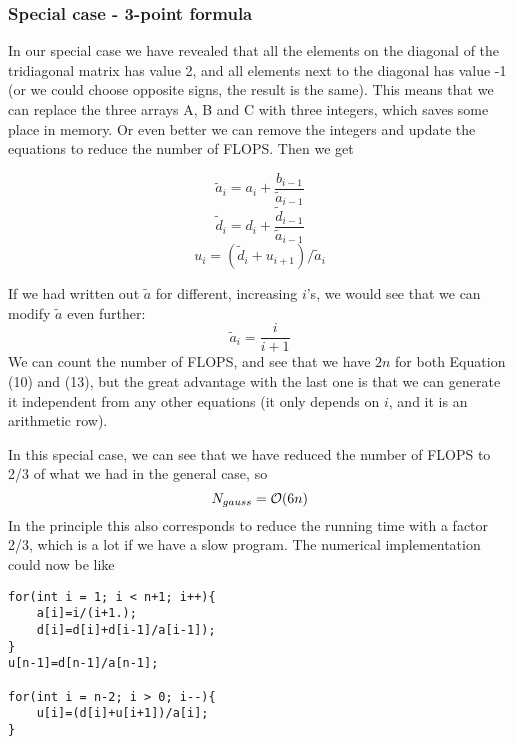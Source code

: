 \documentclass{scrartcl}
\begin{document}
\subsubsection{Special case - 3-point formula}
In our special case we have revealed that all the elements on the diagonal of the tridiagonal matrix has value 2, and all elements next to the diagonal has value -1 (or we could choose opposite signs, the result is the same). This means that we can replace the three arrays A, B and C with three integers, which saves some place in memory. Or even better we can remove the integers and update the equations to reduce the number of FLOPS. Then we get 
\begin{mdframed}
\begin{equation}
\tilde{a}_i=a_i+\frac{b_{i-1}}{\tilde{a}_{i-1}}
\end{equation}
\begin{equation}
\tilde{d}_i=d_i+\frac{\tilde{d}_{i-1}}{ \tilde{a}_{i-1}}
\end{equation}
\begin{equation}
u_i=(\tilde{d}_i+u_{i+1})/\tilde{a}_i
\end{equation}
\end{mdframed}
If we had written out $\tilde{a}$ for different, increasing $i$'s, we would see that we can modify $\tilde{a}$ even further:
\begin{equation}
\tilde{a}_i=\frac{i}{i+1}
\end{equation}
We can count the number of FLOPS, and see that we have $2n$ for both Equation (10) and (13), but the great advantage with the last one is that we can generate it independent from any other equations (it only depends on $i$, and it is an arithmetic row).\par\vspace{3mm}
In this special case, we can see that we have reduced the number of FLOPS to 2/3 of what we had in the general case, so
$$N_{gauss}={\cal O}(6n)$$
In the principle this also corresponds to reduce the running time with a factor 2/3, which is a lot if we have a slow program. The numerical implementation could now be like
\begin{lstlisting}
for(int i = 1; i < n+1; i++){
    a[i]=i/(i+1.);
    d[i]=d[i]+d[i-1]/a[i-1]);
}
u[n-1]=d[n-1]/a[n-1];

for(int i = n-2; i > 0; i--){
    u[i]=(d[i]+u[i+1])/a[i];
}
\end{lstlisting}
\end{document}
